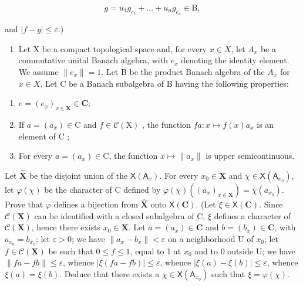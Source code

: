 \[
g = u _ {1} g _ {c _ {1}} + \dots + u _ {n} g _ {c _ {n}} \in \mathrm{B},
\]

and \(|f - g| \leqslant \varepsilon\).)

\begin{enumerate}
\def\labelenumi{\arabic{enumi})}
\setcounter{enumi}{2}
\tightlist
\item
  Let X be a compact topological space and, for every \(x \in X\), let \(A_{x}\) be a commutative unital Banach algebra, with \(e_{x}\) denoting the identity element. We assume \(\|e_{x}\| = 1\). Let B be the product Banach algebra of the \(A_{x}\) for \(x \in X\). Let C be a Banach subalgebra of B having the following properties:
\end{enumerate}

\begin{enumerate}
\def\labelenumi{(\roman{enumi})}
\item
  \(e = (e_x)_{x \in \mathbf{X}} \in \mathbf{C};\)
\item
  If \(a = (a_x) \in \mathrm{C}\) and \(f \in \mathcal{C}(\mathrm{X})\) , the function \(fa: x \mapsto f(x)a_x\) is an element of \(\mathrm{C}\) ;
\item
  For every \(a = (a_x) \in \mathrm{C}\), the function \(x \mapsto \|a_x\|\) is upper semicontinuous.
\end{enumerate}

Let \(\widehat{\mathbf{X}}\) be the disjoint union of the \(\mathsf{X}(\mathsf{A}_x)\). For every \(x_0 \in \mathbf{X}\) and \(\chi \in \mathsf{X}(\mathsf{A}_{x_0})\), let \(\varphi(\chi)\) be the character of C defined by \(\varphi(\chi)((a_x)_{x \in \mathbf{X}}) = \chi(a_{x_0})\). Prove that \(\varphi\) defines a bijection from \(\widehat{\mathbf{X}}\) onto \(\mathsf{X}(\mathbf{C})\). (Let \(\xi \in \mathsf{X}(\mathbf{C})\). Since \(\mathcal{C}(\mathbf{X})\) can be identified with a closed subalgebra of C, \(\xi\) defines a character of \(\mathcal{C}(\mathbf{X})\), hence there exists \(x_0 \in \mathbf{X}\). Let \(a = (a_x) \in \mathbf{C}\) and \(b = (b_x) \in \mathbf{C}\), with \(a_{x_0} = b_{x_0}\); let \(\varepsilon > 0\); we have \(\|a_x - b_x\| < \varepsilon\) on a neighborhood U of \(x_0\); let \(f \in \mathcal{C}(\mathbf{X})\) be such that \(0 \leqslant f \leqslant 1\), equal to 1 at \(x_0\) and to 0 outside U; we have \(\|fa - fb\| \leqslant \varepsilon\), whence \(|\xi(fa - fb)| \leqslant \varepsilon\), whence \(|\xi(a) - \xi(b)| \leqslant \varepsilon\), whence \(\xi(a) = \xi(b)\). Deduce that there exists a \(\chi \in \mathsf{X}(\mathsf{A}_{x_0})\) such that \(\xi = \varphi(\chi)\).

